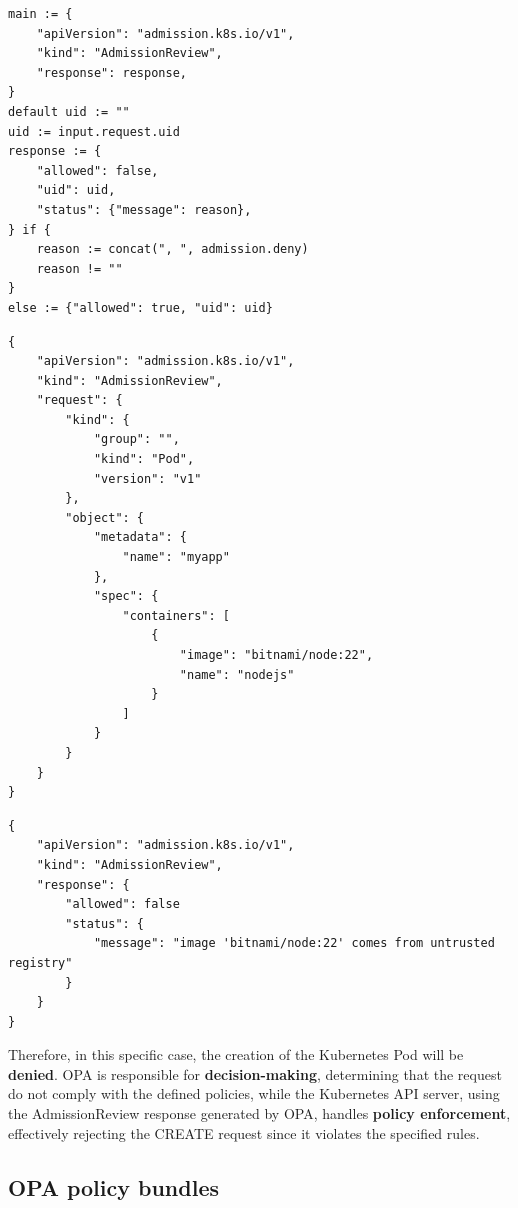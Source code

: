 \vspace{5cm}

\begin{lstlisting}[language=Rego, caption={Rego ``root" policy (system.main)}, label=lst:rego_root_policy]
main := {
	"apiVersion": "admission.k8s.io/v1",
	"kind": "AdmissionReview",
	"response": response,
}
default uid := ""
uid := input.request.uid
response := {
	"allowed": false,
	"uid": uid,
	"status": {"message": reason},
} if {
	reason := concat(", ", admission.deny)
	reason != ""
}
else := {"allowed": true, "uid": uid}
\end{lstlisting}

\lstset{style=jsonstyle}
\begin{lstlisting}[caption={AdmissionReview request}, label={lst:admission_review_request}]
{
    "apiVersion": "admission.k8s.io/v1",
    "kind": "AdmissionReview",
    "request": {
        "kind": {
            "group": "",
            "kind": "Pod",
            "version": "v1"
        },
        "object": {
            "metadata": {
                "name": "myapp"
            },
            "spec": {
                "containers": [
                    {
                        "image": "bitnami/node:22",
                        "name": "nodejs"
                    }
                ]
            }
        }
    }
}
\end{lstlisting}

\lstset{style=jsonstyle}
\begin{lstlisting}[caption={AdmissionReview response}, label={lst:admission_review_response}]
{
    "apiVersion": "admission.k8s.io/v1",
    "kind": "AdmissionReview",
    "response": {
        "allowed": false
        "status": {
            "message": "image 'bitnami/node:22' comes from untrusted registry"
        }
    }
}
\end{lstlisting}

Therefore, in this specific case, the creation of the Kubernetes Pod will be \textbf{denied}. 
OPA is responsible for \textbf{decision-making}, determining that the request do not comply with the defined policies, while the Kubernetes API server, using the AdmissionReview response generated by OPA, handles \textbf{policy enforcement}, effectively rejecting the CREATE request since it violates the specified rules.

\subsection{OPA policy bundles}
\label{sec:opa_bundles}

